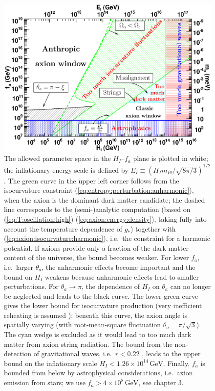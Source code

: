 \documentclass[preprint,nofootinbib]{revtex4}
\newcommand{\units}[1]{\, \mathrm{#1}}
\begin{document}
\begin{figure}[tbp]
\begin{center}
\includegraphics[width=\figwidth,clip=true,trim=0mm 0mm 15mm 10mm]{Anthropic}
\caption{The allowed parameter space in the $H_I$--$f_a$ plane is plotted in white; the inflationary energy scale is defined by $E_I \equiv (H_I m_{Pl}/\sqrt{8\pi/3})^{1/2}$. The green curve in the upper left corner follows from the isocurvature constraint (\ref{eq:entropy:perturbation:anharmonic}), when the axion is the dominant dark matter candidate; the dashed line corresponds to the (semi-)analytic computation (based on (\ref{eq:T:oscillation:high})-(\ref{eq:axion:energy:density}), taking fully into account the temperature dependence of $g_*$) together with (\ref{eq:axion:isocurvature:harmonic}), i.e.\ the constraint for a harmonic potential. If axions provide only a fraction of the dark matter content of the universe, the bound becomes weaker. For lower $f_a$, i.e.\ larger $\theta_a$, the anharmonic effects become important and the bound on $H_I$ weakens because anharmonic effects lead to smaller perturbations. For $\theta_a \to \pi$, the dependence of $H_I$ on $\theta_a$ can no longer be neglected and leads to the black curve. The lower green curve gives the lower bound for isocurvature production (very inefficient reheating is assumed \cite{hertzberg:tegmark:wilczek:axion}); beneath this curve, the axion angle is spatially varying (with root-mean-square fluctuation $\theta_a={\pi}/{\sqrt{3}}$). The cyan wedge is excluded as it would lead to too much dark matter from axion string radiation. The bound from the non-detection of gravitational waves, i.e.\ $r<0.22$ \cite{komatsu:wmap5:cosmological:interpretation}, leads to the upper bound on the inflationary scale $H_I<1.26\times10^{14}\units{GeV}$. Finally, $f_a$ is bounded from below by astrophysical considerations, i.e.\ axion emission from stars; we use $f_a>4\times10^8 \units{GeV}$, see \cite{kuster:raffelt:beltran:axions} chapter 3.}
\label{fig:parameter:space}
\end{center}
\end{figure}
\end{document}
